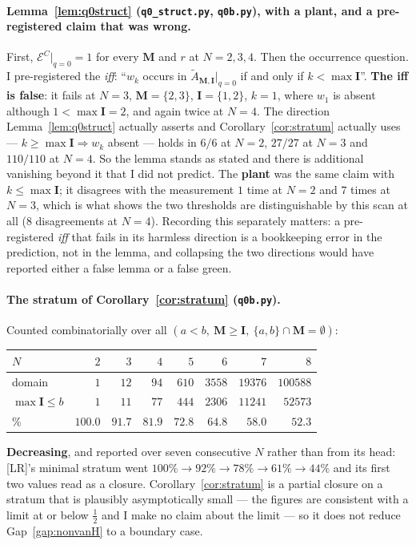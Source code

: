 \documentclass[11pt]{article}
\theoremstyle{plain}
\theoremstyle{definition}
\theoremstyle{remark}
\theoremstyle{plain}
\newcommand{\bI}{\mathbf{I}}
\newcommand{\bM}{\mathbf{M}}
\newcommand{\At}{\widetilde{A}}
\begin{document}
\paragraph{Lemma~\ref{lem:q0struct} (\texttt{q0\_struct.py},
\texttt{q0b.py}), with a plant, and a pre-registered claim that was wrong.}
First, $\mathcal{E}^C|_{q=0}=1$ for every $\bM$ and $r$ at $N=2,3,4$.  Then the
occurrence question.  I pre-registered the \emph{iff}: ``$w_k$ occurs in
$\At_{\bM,\bI}|_{q=0}$ if and only if $k<\max\bI$''.  \textbf{The iff is false}:
it fails at $N=3$, $\bM=\{2,3\}$, $\bI=\{1,2\}$, $k=1$, where $w_1$ is absent
although $1<\max\bI=2$, and again twice at $N=4$.  The direction
Lemma~\ref{lem:q0struct} actually asserts and
Corollary~\ref{cor:stratum} actually uses --- $k\ge\max\bI\Rightarrow w_k$
absent --- holds in $6/6$ at $N=2$, $27/27$ at $N=3$ and $110/110$ at $N=4$.
So the lemma stands as
stated and there is additional vanishing beyond it that I did not predict.
The \textbf{plant} was the same claim with $k\le\max\bI$; it disagrees with the
measurement $1$ time at $N=2$ and $7$ times at $N=3$, which is what shows the
two thresholds are distinguishable by this scan at all ($8$ disagreements at
$N=4$).  Recording this
separately matters: a pre-registered \emph{iff} that fails in its harmless
direction is a bookkeeping error in the prediction, not in the lemma, and
collapsing the two directions would have reported either a false lemma or a
false green.

\paragraph{The stratum of Corollary~\ref{cor:stratum} (\texttt{q0b.py}).}
Counted combinatorially over all $(a<b,\ \bM\ge\bI,\ \{a,b\}\cap\bM=\emptyset)$:
\begin{center}
\begin{tabular}{@{}lrrrrrrr@{}}
\toprule
$N$ & $2$ & $3$ & $4$ & $5$ & $6$ & $7$ & $8$ \\
\midrule
domain              & $1$ & $12$ & $94$ & $610$ & $3558$ & $19376$ & $100588$ \\
$\max\bI\le b$      & $1$ & $11$ & $77$ & $444$ & $2306$ & $11241$ & $52573$ \\
\%                  & $100.0$ & $91.7$ & $81.9$ & $72.8$ & $64.8$ & $58.0$ & $52.3$ \\
\bottomrule
\end{tabular}
\end{center}
\textbf{Decreasing}, and reported over seven consecutive $N$ rather than from
its head: [LR]'s minimal stratum went
$100\%\to92\%\to78\%\to61\%\to44\%$ and its first two values read as a closure.
Corollary~\ref{cor:stratum} is a partial closure on a stratum that is
plausibly asymptotically small --- the figures are consistent with a limit at or
below $\tfrac12$ and I make no claim about the limit --- so it does not reduce
Gap~\ref{gap:nonvanH} to a boundary case.
\end{document}
